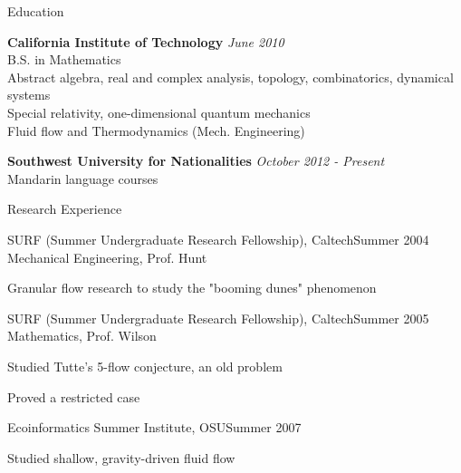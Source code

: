 \documentclass{resume} %
\begin{document}

\begin{rSection}{Education}

{\bf California Institute of Technology} \hfill {\em June 2010} \\
B.S. in Mathematics \smallskip \\
Abstract algebra, real and complex analysis, topology, combinatorics, dynamical systems \\
Special relativity, one-dimensional quantum mechanics \\
Fluid flow and Thermodynamics (Mech. Engineering)

\vspace{0.5em}
{\bf Southwest University for Nationalities} \hfill {\em October 2012 - Present} \\
Mandarin language courses

\end{rSection}



\begin{rSection}{Research Experience}

\begin{rSubsection}{SURF (Summer Undergraduate Research Fellowship), Caltech}{Summer 2004}
{Mechanical Engineering, Prof. Hunt}{}
\item Granular flow research to study the "booming dunes" phenomenon
\end{rSubsection}

\begin{rSubsection}{SURF (Summer Undergraduate Research Fellowship), Caltech}{Summer 2005}
{Mathematics, Prof. Wilson}{}
\item Studied Tutte's 5-flow conjecture, an old problem
\item Proved a restricted case
\end{rSubsection}

\begin{rSubsection}{Ecoinformatics Summer Institute, OSU}{Summer 2007}{}{}
\item Studied shallow, gravity-driven fluid flow
\end{rSubsection}

\end{rSection}
\end{document}
